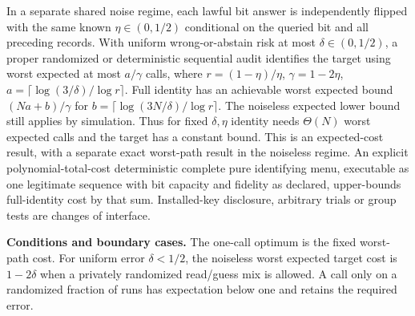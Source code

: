 \begin{theorem}
In a separate shared noise regime, each lawful bit answer is independently flipped with the same known \(\eta\in(0,1/2)\) conditional on the queried bit and all preceding records. With uniform wrong-or-abstain risk at most \(\delta\in(0,1/2)\), a proper randomized or deterministic sequential audit identifies the target using worst expected at most \(a/\gamma\) calls, where \(r=(1-\eta)/\eta\), \(\gamma=1-2\eta\), \(a=\lceil\log(3/\delta)/\log r\rceil\). Full identity has an achievable worst expected bound \((Na+b)/\gamma\) for \(b=\lceil\log(3N/\delta)/\log r\rceil\). The noiseless expected lower bound still applies by simulation. Thus for fixed \(\delta,\eta\) identity needs \(\Theta(N)\) worst expected calls and the target has a constant bound. This is an expected-cost result, with a separate exact worst-path result in the noiseless regime. An explicit polynomial-total-cost deterministic complete pure identifying menu, executable as one legitimate sequence with bit capacity and fidelity as declared, upper-bounds full-identity cost by that sum. Installed-key disclosure, arbitrary trials or group tests are changes of interface.

\textbf{Conditions and boundary cases.} The one-call optimum is the fixed worst-path cost. For uniform error \(\delta<1/2\), the noiseless worst expected target cost is \(1-2\delta\) when a privately randomized read/guess mix is allowed. A call only on a randomized fraction of runs has expectation below one and retains the required error.

\end{theorem}

